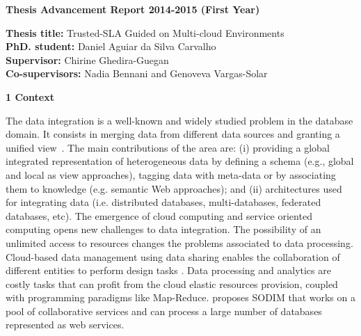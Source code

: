 \documentclass[11pt,a4paper,oneside]{report}
\author{Daniel Aguiar da Silva Carvalho}
\begin{document}
\sffamily
\begin{center}
\textbf{\large{Thesis Advancement Report 2014-2015 (First Year)}}
\end{center}

\begin{flushleft}
\textbf{Thesis title:} Trusted-SLA Guided on Multi-cloud Environments \\
\textbf{PhD. student:} Daniel Aguiar da Silva Carvalho \\
\textbf{Supervisor:} Chirine Ghedira-Guegan \\ 
\textbf{Co-supervisors:} Nadia Bennani and Genoveva Vargas-Solar
\end{flushleft}


\begin{flushleft}
\textbf{1 Context}\\
\end{flushleft} 
The data integration is a well-known and widely studied problem in the database domain. 
It consists in merging data from different data sources and granting a unified view~\cite{Lenzerini:2002}. 
%
The main contributions of the area are: (i) providing a global integrated representation of heterogeneous data  by defining a schema (e.g., global and local as view approaches), tagging data with meta-data or by associating them to knowledge (e.g. semantic Web approaches); and (ii)   architectures used for integrating data (i.e. distributed databases, multi-databases,  federated databases, etc).
%
The emergence of cloud computing and service oriented computing opens new challenges to data integration. 
The possibility of an unlimited access to resources  changes the problems associated to data processing. Cloud-based data management using data sharing  enables the collaboration of different entities to perform design tasks \cite{Gonzalez:2010,Gonzalez:2010b}. Data processing and analytics are costly tasks that can profit from the cloud elastic resources provision, coupled with  programming paradigms like Map-Reduce.\cite{078} proposes SODIM that works on a pool of collaborative services and can process a large number of databases represented as web services. 

\end{document}
